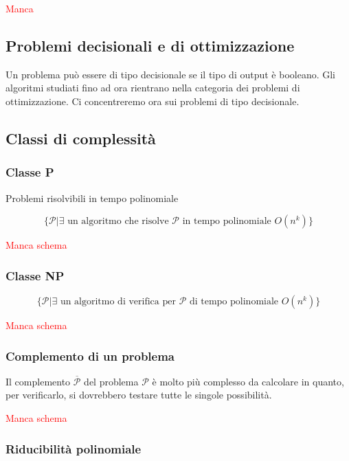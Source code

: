\documentclass[11pt,a4paper,twoside,openright]{book}
\newcommand\myworries[1]{\textcolor{red}{#1}}
\begin{document}
{{\myworries{Manca}

\subsection{Problemi decisionali e di ottimizzazione}

Un problema può essere di tipo decisionale se il tipo di output è booleano. Gli algoritmi studiati fino ad ora rientrano nella categoria dei problemi di ottimizzazione. Ci concentreremo ora sui problemi di tipo decisionale.

\subsection{Classi di complessità}

\subsubsection{Classe P}
Problemi risolvibili in tempo polinomiale

\begin{equation}
\{\mathcal{P} | \exists \text{ un algoritmo che risolve } \mathcal{P} \text{ in tempo polinomiale } O(n^k)\}
\end{equation}

\myworries{Manca schema}

\subsubsection{Classe NP}

\begin{equation}
\{\mathcal{P} | \exists \text{ un algoritmo di verifica per } \mathcal{P} \text{ di tempo polinomiale } O(n^k) \}
\end{equation}

\myworries{Manca schema}

\subsubsection{Complemento di un problema}

Il complemento $\mathcal{\overline{P}}$ del problema $\mathcal{P}$ è molto più complesso da calcolare in quanto, per verificarlo, si dovrebbero testare tutte le singole possibilità.

\myworries{Manca schema}

\subsubsection{Riducibilità polinomiale}

}}
\end{document}
